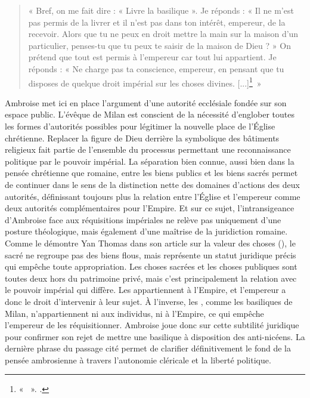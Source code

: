 \bigskip

\begin{quote}
    « Bref, on me fait dire : « Livre la basilique ». Je réponds : « Il ne m’est pas permis de la livrer et il n’est pas dans ton intérêt, empereur, de la recevoir. Alors que tu ne peux en droit mettre la main sur la maison d’un particulier, penses-tu que tu peux te saisir de la maison de Dieu ? » On prétend que tout est permis à l’empereur car tout lui appartient. Je réponds : « Ne charge pas ta conscience, empereur, en pensant que tu disposes de quelque droit impérial sur les choses divines. [...]\footnote{« ~». \cite[,19]{ambroise_lettres}.}~»
\end{quote}

\bigskip

Ambroise met ici en place l’argument d’une autorité ecclésiale fondée sur son espace public. L’évêque de Milan est conscient de la nécessité d’englober toutes les formes d’autorités possibles pour légitimer la nouvelle place de l’Église chrétienne. Replacer la figure de Dieu derrière la symbolique des bâtiments religieux fait partie de l’ensemble du processus permettant une reconnaissance politique par le pouvoir impérial. La séparation bien connue, aussi bien dans la pensée chrétienne que romaine, entre les biens publics et les biens sacrés permet de continuer dans le sens de la distinction nette des domaines d’actions des deux autorités, définissant toujours plus la relation entre l’Église et l’empereur comme deux autorités complémentaires pour l’Empire. Et sur ce sujet, l'intransigeance d'Ambroise face aux réquisitions impériales ne relève pas uniquement d'une posture théologique, mais également d'une maîtrise de la juridiction romaine. Comme le démontre Yan Thomas dans son article sur la valeur des choses (), le sacré ne regroupe pas des biens flous, mais représente un statut juridique précis qui empêche toute appropriation. Les choses sacrées et les choses publiques sont toutes deux hors du patrimoine privé, mais c'est principalement la relation avec le pouvoir impérial qui diffère. Les  appartiennent à l'Empire, et l'empereur a donc le droit d'intervenir à leur sujet. À l'inverse, les , comme les basiliques de Milan, n'appartiennent ni aux individus, ni à l'Empire, ce qui empêche l'empereur de les réquisitionner\autocite{thomas_valeur_2002}. Ambroise joue donc sur cette subtilité juridique pour confirmer son rejet de mettre une basilique à disposition des anti-nicéens. La dernière phrase du passage cité permet de clarifier définitivement le fond de la pensée ambrosienne à travers l’autonomie cléricale et la liberté politique.

